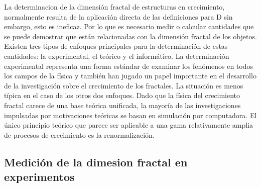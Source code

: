 \documentclass[11pt]{article}
\begin{document}

La determinacion de la dimensión fractal de estructuras en crecimiento, normalmente resulta de la aplicación directa de las definiciones para D sin embargo, esto es ineficaz. Por lo que es necesario medir o calcular cantidades que se puede demostrar que están relacionadas con la dimensión fractal de los objetos. Existen  tres tipos de enfoques principales para la determinación de estas cantidades: la experimental, el teórico y el informático. La determinación experimental representa una forma estándar de examinar los fenómenos en todos los campos de la física y también han jugado un papel importante en el desarrollo de la investigación sobre el crecimiento de los fractales. La situación es menos típica en el caso de los otros dos enfoques. Dado que la física del crecimiento fractal carece de una base teórica unificada, la mayoría de las investigaciones impulsadas por motivaciones teóricas se basan en simulación por computadora. El único principio teórico que parece ser aplicable a una gama relativamente amplia de procesos de crecimiento es la renormalización.


\subsection{Medición de la dimesion fractal en experimentos}
\end{document}
